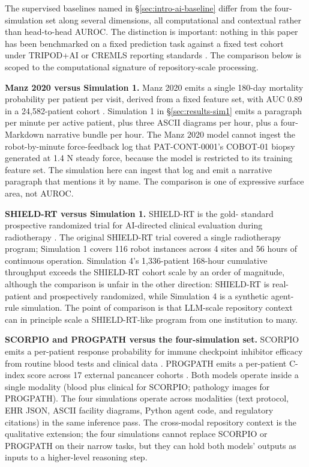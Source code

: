 The supervised baselines named in \S\ref{sec:intro-ai-baseline} differ
from the four-simulation set along several dimensions, all
computational and contextual rather than head-to-head AUROC. The
distinction is important: nothing in this paper has been benchmarked
on a fixed prediction task against a fixed test cohort under TRIPOD+AI
or CREMLS reporting standards \cite{Collins2024TRIPODAI,
ElEmam2024CREMLS}. The comparison below is scoped to the
computational signature of repository-scale processing.

\textbf{Manz 2020 versus Simulation 1.} Manz 2020 emits a single
180-day mortality probability per patient per visit, derived from a
fixed feature set, with AUC 0.89 in a 24,582-patient cohort
\cite{Manz2020Oncology180DayMortality}. Simulation 1 in
\S\ref{sec:results-sim1} emits a paragraph per minute per active
patient, plus three ASCII diagrams per hour, plus a four-Markdown
narrative bundle per hour. The Manz 2020 model cannot ingest the
robot-by-minute force-feedback log that PAT-CONT-0001's COBOT-01
biopsy generated at 1.4 N steady force, because the model is
restricted to its training feature set. The simulation here can
ingest that log and emit a narrative paragraph that mentions it by
name. The comparison is one of expressive surface area, not AUROC.

\textbf{SHIELD-RT versus Simulation 1.} SHIELD-RT is the gold-
standard prospective randomized trial for AI-directed clinical
evaluation during radiotherapy \cite{Hong2020SHIELDRT,
Elia2025SHIELDRTExternalValidation}. The original SHIELD-RT trial
covered a single radiotherapy program; Simulation 1 covers 116 robot
instances across 4 sites and 56 hours of continuous operation.
Simulation 4's 1,336-patient 168-hour cumulative throughput exceeds
the SHIELD-RT cohort scale by an order of magnitude, although the
comparison is unfair in the other direction: SHIELD-RT is real-
patient and prospectively randomized, while Simulation 4 is a
synthetic agent-rule simulation. The point of comparison is that
LLM-scale repository context can in principle scale a SHIELD-RT-like
program from one institution to many.

\textbf{SCORPIO and PROGPATH versus the four-simulation set.} SCORPIO
emits a per-patient response probability for immune checkpoint
inhibitor efficacy from routine blood tests and clinical data
\cite{Yoo2025SCORPIO}. PROGPATH emits a per-patient C-index score
across 17 external pancancer cohorts \cite{Yuan2025PROGPATH}. Both
models operate inside a single modality (blood plus clinical for
SCORPIO; pathology images for PROGPATH). The four simulations operate
across modalities (text protocol, EHR JSON, ASCII facility diagrams,
Python agent code, and regulatory citations) in the same inference
pass. The cross-modal repository context is the qualitative
extension; the four simulations cannot replace SCORPIO or PROGPATH on
their narrow tasks, but they can hold both models' outputs as inputs
to a higher-level reasoning step.

